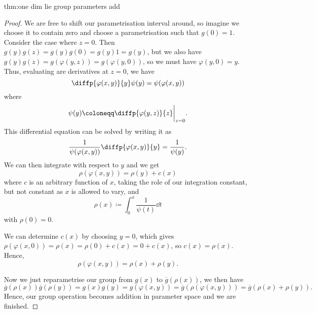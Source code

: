 \documentclass[fleqn]{NotesClass}
\begin{document}
\begin{thm}{}{thm:one dim lie group parameters add}
\begin{proof}
            We are free to shift our parametrisation interval around, so imagine we choose it to contain zero and choose a parametrisation such that \(g(0) = 1\).
            Consider the case where \(z = 0\).
            Then \(g(y)g(z) = g(y)g(0) = g(y)1 = g(y)\), but we also have \(g(y)g(z) = g(\varphi(y, z)) = g(\varphi(y, 0))\), so we must have \(\varphi(y, 0) = y\).
            Thus, evaluating are derivatives at \(z = 0\), we have
            \begin{equation}
                \diffp{\varphi(x, y)}{y} \psi(y) = \psi(\varphi(x, y))
            \end{equation}
            where
            \begin{equation}
                \psi(y) \coloneqq \diffp{\varphi(y, z)}{z} \bigg|_{z = 0}.
            \end{equation}
            This differential equation can be solved by writing it as
            \begin{equation}
                \frac{1}{\psi(\varphi(x, y))} \diffp{\varphi(x, y)}{y} = \frac{1}{\psi(y)}.
            \end{equation}
            We can then integrate with respect to \(y\) and we get
            \begin{equation}
                \rho(\varphi(x, y)) = \rho(y) + c(x)
            \end{equation}
            where \(c\) is an arbitrary function of \(x\), taking the role of our integration constant, but not constant as \(x\) is allowed to vary, and 
            \begin{equation}
                \rho(x) \coloneqq \int_0^x \frac{1}{\psi(t)} \dd{t}
            \end{equation}
            with \(\rho(0) = 0\).
            
            We can determine \(c(x)\) by choosing \(y = 0\), which gives \(\rho(\varphi(x, 0)) = \rho(x) = \rho(0) + c(x) = 0 + c(x)\), so \(c(x) = \rho(x)\).
            Hence,
            \begin{equation}
                \rho(\varphi(x, y)) = \rho(x) + \rho(y).
            \end{equation}
            
            Now we just reparametrise our group from \(g(x)\) to \(\overbar{g}(\rho(x))\), we then have
            \begin{equation}
                \overbar{g}(\rho(x))\overbar{g}(\rho(y)) = g(x)g(y) = g(\varphi(x, y)) = \overbar{g}(\rho(\varphi(x, y))) = \overbar{g}(\rho(x) + \rho(y)).
            \end{equation}
            Hence, our group operation becomes addition in parameter space and we are finished.
        \end{proof}
    \end{thm}
    
\end{document}
